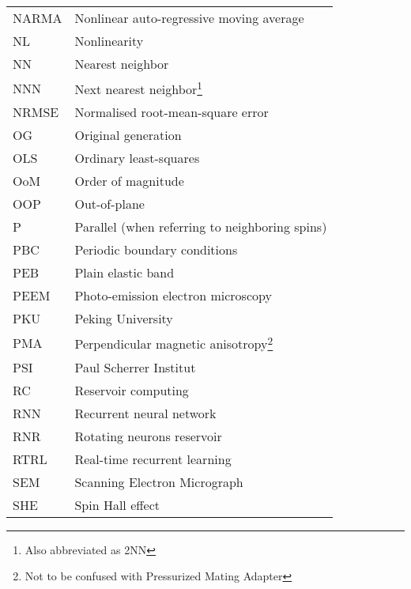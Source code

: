 {\begin{longtable}[l]{ll}
        NARMA & Nonlinear auto-regressive moving average    \\
        NL    & Nonlinearity                                \\
        NN    & Nearest neighbor                            \\
        NNN   & Next nearest neighbor\footnote{Also abbreviated as 2NN} \\ %
        NRMSE & Normalised root-mean-square error           \\
        OG    & Original generation                         \\
        OLS   & Ordinary least-squares                      \\
        OoM   & Order of magnitude                          \\
        OOP   & Out-of-plane                                \\
        P     & Parallel (when referring to neighboring spins) \\
        PBC   & Periodic boundary conditions                \\
        PEB   & Plain elastic band                          \\
        PEEM  & Photo-emission electron microscopy          \\
        PKU   & Peking University                           \\
        PMA   & Perpendicular magnetic anisotropy\footnote{Not to be confused with Pressurized Mating Adapter} \\
        PSI   & Paul Scherrer Institut                      \\
        RC    & Reservoir computing                         \\
        RNN   & Recurrent neural network                    \\
        RNR   & Rotating neurons reservoir                  \\
        RTRL  & Real-time recurrent learning                \\
        SEM   & Scanning Electron Micrograph                \\
        SHE   & Spin Hall effect~\cite{SHE}                 \\ %

\end{longtable}}
